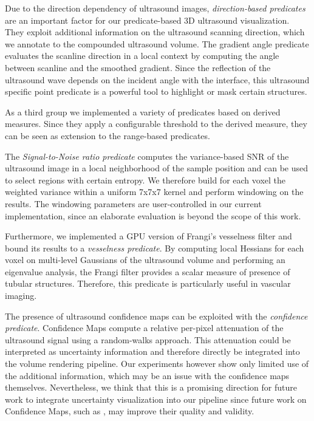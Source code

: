 Due to the direction dependency of ultrasound images, \emph{direction-based predicates} are an important factor for our predicate-based 3D ultrasound visualization. 
They exploit additional information on the ultrasound scanning direction, which we annotate to the compounded ultrasound volume. 
The gradient angle predicate evaluates the scanline direction in a local context by computing the angle between scanline and the smoothed gradient. 
Since the reflection of the ultrasound wave depends on the incident angle with the interface, this ultrasound specific point predicate is a powerful tool to highlight or mask certain structures. 


As a third group we implemented a variety of predicates based on derived measures. 
Since they apply a configurable threshold to the derived measure, they can be seen as extension to the range-based predicates. 

The \emph{Signal-to-Noise ratio predicate} computes the variance-based SNR of the ultrasound image in a local neighborhood of the sample position and can be used to select regions with certain entropy. 
We therefore build for each voxel the weighted variance within a uniform 7x7x7 kernel and perform windowing on the results.
The windowing parameters are user-controlled in our current implementation, since an elaborate evaluation is beyond the scope of this work.

Furthermore, we implemented a GPU version of Frangi's vesselness filter \cite{Frangi98} and bound its results to a \emph{vesselness predicate}. 
By computing local Hessians for each voxel on multi-level Gaussians of the ultrasound volume and performing an eigenvalue analysis, the Frangi filter provides a scalar measure of presence of tubular structures.
Therefore, this predicate is particularly useful in vascular imaging. 


The presence of ultrasound confidence maps \cite{Karamalis12} can be exploited with the \emph{confidence predicate}. 
Confidence Maps compute a relative per-pixel attenuation of the ultrasound signal using a random-walks approach.
This attenuation could be interpreted as uncertainty information and therefore directly be integrated into the volume rendering pipeline.
Our experiments however show only limited use of the additional information, which may be an issue with the confidence maps themselves.
Nevertheless, we think that this is a promising direction for future work to integrate uncertainty visualization into our pipeline since future work on Confidence Maps, such as \cite{Hennersperger14}, may improve their quality and validity.

